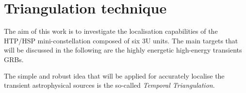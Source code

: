 \documentclass[]{spie}  %
\begin{document}

\section{Triangulation technique}
The aim of this work is to investigate the localisation capabilities of the HTP/HSP mini-constellation composed of six 3U units. The main targets that will be discussed in the following are the highly energetic high-energy transients GRBs. 

The simple and robust idea that will be applied for accurately localise the transient astrophysical sources is the so-called \emph{Temporal Triangulation}.  
\end{document}
